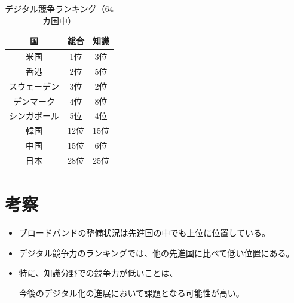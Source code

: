 \documentclass[a4paper,11pt,dvipdfmx]{ujarticle}
\begin{document}
\begin{table}[htbp]
    \centering
    \caption{デジタル競争ランキング（64カ国中）}
    \label{tbl:競争ランキング}

    \begin{tabular}{|c|c|c|}\hline
        国 & 総合 & 知識 \\
        \hline
        米国 & 1位 & 3位 \\
        \hline
        香港 & 2位 &  5位 \\
        \hline
        スウェーデン & 3位 &  2位 \\
        \hline
        デンマーク & 4位 &  8位 \\
        \hline
        シンガポール & 5位 &  4位 \\
        \hline\hline
        韓国 &12位 &15位 \\
        \hline 
        中国 &15位 & 6位 \\
        \hline\hline
        日本 &28位 &25位 \\
        \hline
    \end{tabular}
\end{table}

\section{考察}
\begin{itemize}
    \item ブロードバンドの整備状況は先進国の中でも上位に位置している。
    \item デジタル競争力のランキングでは、他の先進国に比べて低い位置にある。
    \item 特に、知識分野での競争力が低いことは、

    今後のデジタル化の進展において課題となる可能性が高い。
\end{itemize}
%

%


\end{document}

